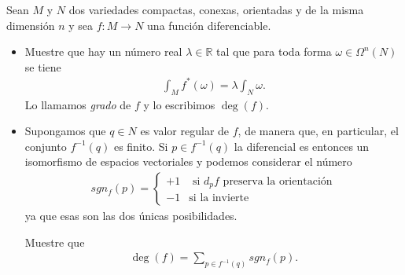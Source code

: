 \documentclass[11pt]{article}
\newcommand{\R}{\mathbb{R}}
\newcommand{\paint}[1]{\color{color}{#1}}
\newenvironment{exercise}[2][Ejercicio]{\begin{trivlist}
\item[\hskip \labelsep \paint{{\bfseries #1}}\hskip \labelsep {\bfseries #2.}]}{\end{trivlist}}
\begin{document}
\begin{exercise}{2} Sean $M$ y $N$ dos variedades compactas, conexas, orientadas y de la misma dimensión $n$ y sea $f : M \to N$ una función diferenciable.
\begin{itemize}[listparindent = \parindent]
\item[(a)] Muestre que hay un número real $\lambda \in \R$ tal que para toda forma $\omega \in \Omega^n(N)$ se tiene 
\begin{align*}
\int_Mf^*(\omega) = \lambda\int_N \omega.
\end{align*}
Lo llamamos \textit{grado} de $f$ y lo escribimos $\deg(f)$.
\item[(b)] Supongamos que $q \in N$ es valor regular de $f$, de manera que, en particular, el conjunto $f^{-1}(q)$ es finito. Si $p \in f^{-1}(q)$ la diferencial es entonces un isomorfismo de espacios vectoriales y podemos considerar el número
\begin{align*}
sgn_f(p) = \begin{cases}
+1&\text{ si $d_pf$ preserva la orientación}\\
-1&\text{si la invierte}
\end{cases}
\end{align*}
ya que esas son las dos únicas posibilidades.

Muestre que
\begin{align*}
\deg(f) = \sum_{p \in f^{-1}(q)}sgn_f(p).
\end{align*}
\end{itemize}
\end{exercise}
\end{document}
